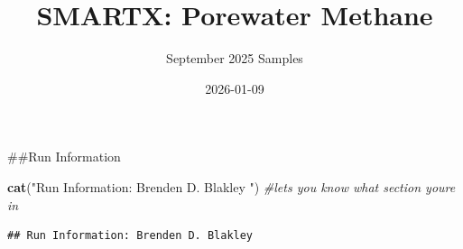 \documentclass[
]{article}
\title{SMARTX: Porewater Methane}
\author{September 2025 Samples}
\date{2026-01-09}
\newenvironment{Shaded}{\begin{snugshade}}{\end{snugshade}}
\newcommand{\CommentTok}[1]{\textcolor[rgb]{0.56,0.35,0.01}{\textit{#1}}}
\newcommand{\FunctionTok}[1]{\textcolor[rgb]{0.13,0.29,0.53}{\textbf{#1}}}
\newcommand{\NormalTok}[1]{#1}
\newcommand{\StringTok}[1]{\textcolor[rgb]{0.31,0.60,0.02}{#1}}
\begin{document}
\maketitle

{
\setcounter{tocdepth}{1}
\tableofcontents
}
\newpage

\#\#Run Information

\begin{Shaded}
\begin{Highlighting}[]
\FunctionTok{cat}\NormalTok{(}\StringTok{"Run Information: Brenden D. Blakley "}\NormalTok{) }\CommentTok{\#lets you know what section you\textquotesingle{}re in}
\end{Highlighting}
\end{Shaded}

\begin{verbatim}
## Run Information: Brenden D. Blakley
\end{verbatim}
\end{document}
